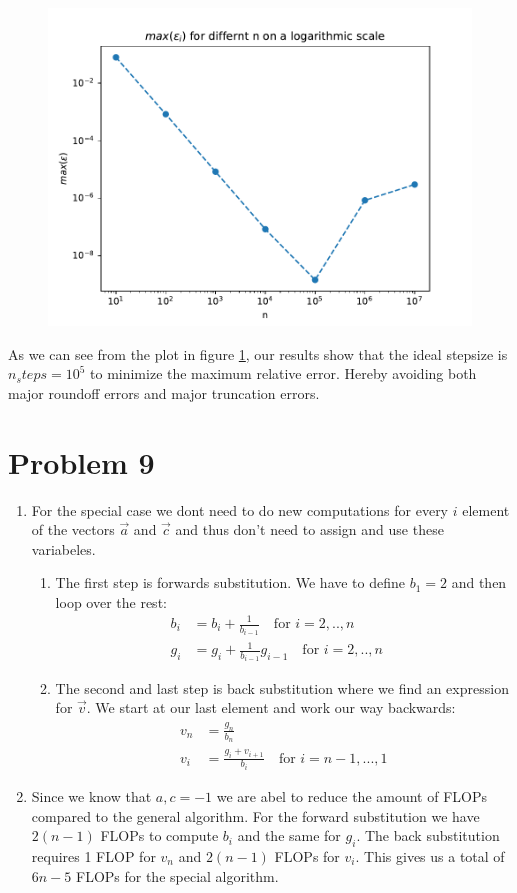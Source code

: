 \documentclass[english,notitlepage]{revtex4-1}  %
\begin{document}
\begin{enumerate}[label= \alph*)]

  \begin{figure}[H]
    \centering
    \includegraphics[width=.7\textwidth]{../figures/max_rel_error.pdf}
    \caption{}
    \label{fig:max_rel_error}
  \end{figure}
As we can see from the plot in figure \ref{fig:max_rel_error}, our results show that the ideal stepsize is $n_steps = 10^5$ to minimize the maximum relative error. Hereby avoiding both major roundoff errors and major truncation errors.
\end{enumerate}
\section*{Problem 9}
\begin{enumerate}[label= \alph*)]
  \item For the special case we dont need to do new computations for every $i$ element of the vectors $\vec{a}$ and $\vec{c}$ and thus don't need to assign and use these variabeles.
  \begin{enumerate}[label=\roman*)]
    \item The first step is forwards substitution. We have to define $b_1 = 2$ and then loop over the rest:
    \begin{align*}
      b_i &= b_i + \frac{1}{b_{i-1}} \quad  \text{for }i=2,..,n \quad\\
      g_i &= g_i + \frac{1}{b_{i-1}}g_{i-1} \quad  \text{for } i = 2,..,n \quad
    \end{align*}
    \item The second and last step is back substitution where we find an expression for $\vec{v}$. We start at our last element and work our way backwards:
    \begin{align*}
      v_n &= \frac{g_n}{b_n} \\
      v_i &= \frac{g_i + v_{i+1}}{b_i} \quad \text{for } i = n-1,...,1
    \end{align*}
  \end{enumerate}
  \item Since we know that $a,c = -1$ we are abel to reduce the amount of FLOPs compared to the general algorithm. For the forward substitution we have $2(n-1)$ FLOPs to compute $b_i$ and the same for $g_i$. The back substitution requires 1 FLOP for $v_n$ and $2(n-1)$ FLOPs for $v_i$. This gives us a total of $6n-5$ FLOPs for the special algorithm.
\end{enumerate}
\end{document}
